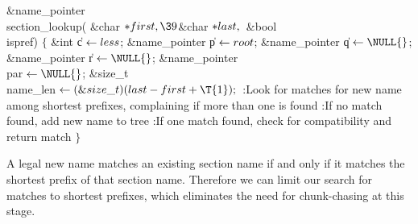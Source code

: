 \Y\B\1\1\&{name\_pointer} \\{section\_lookup}(\6
\&{char} ${}{*}\\{first},\39{}$\&{char} ${}{*}\\{last},{}$\6
\&{bool} \\{ispref})\2\2\6
${}\{{}$\1\6
\&{int} \|c${}\leftarrow\\{less}{}$;\6
\&{name\_pointer} \|p${}\leftarrow\\{root}{}$;\6
\&{name\_pointer} \|q${}\K\NULL{}$;\6
\&{name\_pointer} \|r${}\K\NULL{}$;\6
\&{name\_pointer} \\{par}${}\K\NULL{}$;\6
\&{size\_t} \\{name\_len}${}\K(\&{size\_t})(\\{last}-\\{first}+\T{1});{}$\7
:Look for matches for new name among shortest prefixes, complaining if more
than one is found\X\6
:If no match found, add new name to tree\X\6
:If one match found, check for compatibility and return match\X\6
\4${}\}{}$\2\par
\fi

A legal new name matches an existing section name if and only if it
matches the shortest prefix of that section name.  Therefore we can
limit our search for matches to shortest prefixes, which eliminates
the need for chunk-chasing at this stage.

